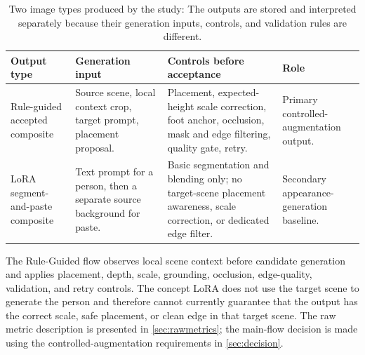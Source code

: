\documentclass[11pt,a4paper]{article}
\begin{document}
\begin{table}[t]
  \centering
  \caption[Two output types]{{Two image types produced by the study:} The outputs are stored and interpreted separately because their generation inputs, controls, and validation rules are different.}
  \label{tab:two-output-types}
  \scriptsize
  \begin{tabular}{@{}p{2.5cm}p{2.7cm}p{3.1cm}p{2.15cm}@{}}
    \toprule
    \textbf{Output type} & \textbf{Generation input} & \textbf{Controls before acceptance} & \textbf{Role} \\
    \midrule
    Rule-guided accepted composite & Source scene, local context crop, target prompt, placement proposal. & Placement, expected-height scale correction, foot anchor, occlusion, mask and edge filtering, quality gate, retry. & Primary controlled-augmentation output. \\
    LoRA segment-and-paste composite & Text prompt for a person, then a separate source background for paste. & Basic segmentation and blending only; no target-scene placement awareness, scale correction, or dedicated edge filter. & Secondary appearance-generation baseline. \\
    \bottomrule
  \end{tabular}
\end{table}

The Rule-Guided flow observes local scene context before candidate generation and applies placement, depth, scale, grounding, occlusion, edge-quality, validation, and retry controls. The concept LoRA does not use the target scene to generate the person and therefore cannot currently guarantee that the output has the correct scale, safe placement, or clean edge in that target scene. The raw metric description is presented in \cref{sec:rawmetrics}; the main-flow decision is made using the controlled-augmentation requirements in \cref{sec:decision}.
\end{document}
